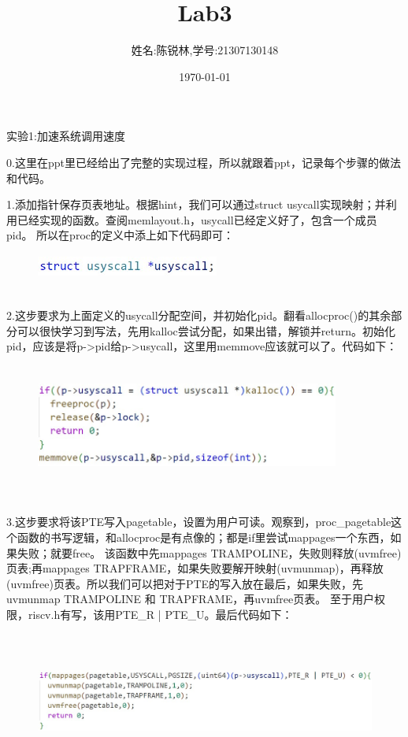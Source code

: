 \documentclass[12pt]{article}
\title{Lab3}
\author{姓名:陈锐林,学号:21307130148}
\date{\today}
\begin{document}
\maketitle
\begin{Large}
	\noindent 实验1:加速系统调用速度\par
\end{Large}
\noindent
\hspace*{2em}0.这里在ppt里已经给出了完整的实现过程，所以就跟着ppt，记录每个步骤的做法和代码。\par
1.添加指针保存页表地址。根据hint，我们可以通过struct usycall实现映射；并利用已经实现的函数。查阅memlayout.h，usycall已经定义好了，包含一个成员pid。
所以在proc的定义中添上如下代码即可：
\begin{figure}[h]
	\centering
	\includegraphics[height=0.8cm,width=6cm]{lab3-1.jpg}
\end{figure}\\
\hspace*{2em}2.这步要求为上面定义的usycall分配空间，并初始化pid。翻看allocproc()的其余部分可以很快学习到写法，先用kalloc尝试分配，如果出错，解锁并return。初始化pid，应该是将p->pid给p->usycall，这里用memmove应该就可以了。代码如下：
\begin{figure}[h]
	\centering
	\includegraphics[height=4cm,width=10cm]{lab3-2.jpg}
\end{figure}\\
\hspace*{2em}3.这步要求将该PTE写入pagetable，设置为用户可读。观察到，proc\_pagetable这个函数的书写逻辑，和allocproc是有点像的；都是if里尝试mappages一个东西，如果失败；就要free。
该函数中先mappages TRAMPOLINE，失败则释放(uvmfree)页表;再mappages TRAPFRAME，如果失败要解开映射(uvmunmap)，再释放(uvmfree)页表。所以我们可以把对于PTE的写入放在最后，如果失败，先uvmunmap TRAMPOLINE 和 TRAPFRAME，再uvmfree页表。
至于用户权限，riscv.h有写，该用PTE\_R | PTE\_U。最后代码如下：
\newpage
\begin{figure}[h]
	\centering
	\includegraphics[height=4.5cm,width=15cm]{lab3-3.jpg}
\end{figure}
\end{document}
